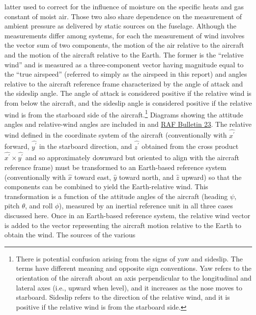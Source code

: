 \documentclass[12pt,twoside,english]{article}\usepackage[]{graphicx}\usepackage[]{color}
\let\OrgIndex\index
\renewcommand*{\index}[1]{\OrgIndex{#1}}
\begin{document}
latter used to correct for the influence of moisture on the specific heats and gas constant of moist air. Those two also share dependence on the measurement of ambient pressure as delivered by static sources on the fuselage. Although the measurements differ among systems, for each the measurement of wind involves the vector sum of two components, the motion of the air relative to the aircraft and the motion of the aircraft relative to the Earth. The former is the ``relative wind'' and is measured as a three-component vector having magnitude equal to the ``true airspeed'' (referred to simply as the airspeed in this report) and angles relative to the aircraft reference frame characterized by the angle of attack and the sideslip angle. The angle of attack is considered positive if the relative wind is from below the aircraft, and the sideslip angle is considered positive if the relative wind is from the starboard side of the aircraft.\footnote{There is potential confusion arising from the signs of yaw and sideslip. The terms have different meaning and opposite sign conventions. Yaw refers to the orientation of the aircraft about an axis perpendicular to the longitudinal and lateral axes (i.e., upward when level), and it increases as the nose moves to starboard. Sideslip refers to the direction of the relative wind, and it is positive if the relative wind is from the starboard side.} Diagrams showing the attitude angles and relative-wind angles are included in \citet{NCAR_OpenSky_TECH-NOTE-000-000-000-064} and \href{https://www.eol.ucar.edu/raf/Bulletins/bulletin23.html}{RAF Bulletin 23}. The relative wind defined in the coordinate system of the aircraft (conventionally with $\hat{x^{\prime}}$ forward, $\hat{y^{\prime}}$ in the starboard direction, and $\hat{z^{\prime}}$ obtained from the cross product $\hat{x^{\prime}}\times\hat{y^{\prime}}$ and so approximately downward but oriented to align with the aircraft reference frame) must be transformed to an Earth-based reference system (conventionally with $\hat{x}$ toward east, $\hat{y}$ toward north, and $\hat{z}$ upward) so that the components can be combined to yield the Earth-relative wind. This transformation is a function of the attitude angles of the aircraft (heading $\psi$, pitch $\theta$, and roll $\phi$), measured by an inertial reference unit in all three cases discussed here. Once in an Earth-based reference system, the relative wind vector is added to the vector representing the aircraft motion relative to the Earth to obtain the wind. The sources of the various 
\end{document}
